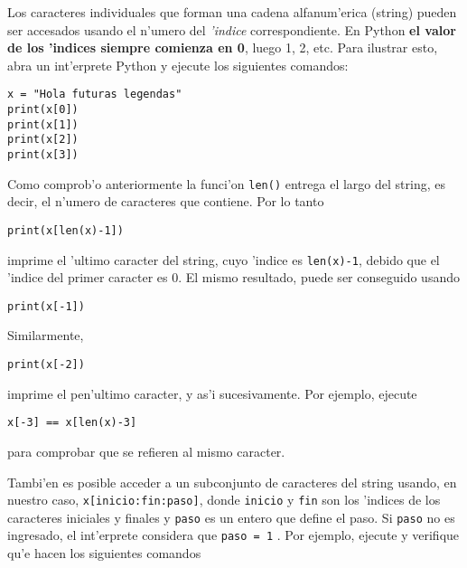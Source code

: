 \documentclass[11pt]{exam}
\begin{document}
\begin{questions}
\item Los caracteres individuales que forman una cadena alfanum'erica (string) pueden ser accesados usando el n'umero del \textit{'indice} correspondiente. En Python \textbf{el valor de los 'indices siempre comienza en 0}, luego 1, 2, etc. Para ilustrar esto, abra un int'erprete Python y ejecute los siguientes comandos:

\begin{verbatim}
x = "Hola futuras legendas"
print(x[0])
print(x[1])
print(x[2])
print(x[3])
\end{verbatim}

\item Como comprob'o anteriormente la funci'on \texttt{len()} entrega el largo del string, es decir, el n'umero de caracteres que contiene. Por lo tanto

\begin{verbatim}
print(x[len(x)-1])
\end{verbatim}

imprime el 'ultimo caracter del string, cuyo 'indice es \texttt{len(x)-1}, debido que el 'indice del primer caracter es 0. El mismo resultado, puede ser conseguido usando

\begin{verbatim}
print(x[-1])
\end{verbatim}

Similarmente,

\begin{verbatim}
print(x[-2])
\end{verbatim}

imprime el pen'ultimo caracter, y as'i sucesivamente. Por ejemplo, ejecute

\begin{verbatim}
x[-3] == x[len(x)-3]
\end{verbatim}

para comprobar que se refieren al mismo caracter.

\item Tambi'en es posible acceder a un subconjunto de caracteres del string usando, en nuestro caso, \texttt{x[inicio:fin:paso]}, donde \texttt{inicio} y \texttt{fin} son los 'indices de los caracteres iniciales y finales y \texttt{paso} es un entero que define el paso. Si \texttt{paso} no es ingresado, el int'erprete considera que \texttt{paso = 1} . Por ejemplo, ejecute y verifique qu'e hacen los siguientes comandos


\end{questions}
\end{document}

